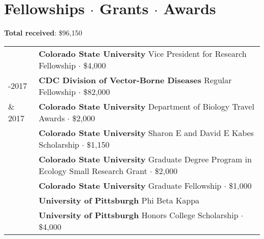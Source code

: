 \documentclass[letterpaper]{deedy-resume} %
\begin{document}
\section{Fellowships $\cdot$ Grants $\cdot$ Awards} 
\raggedright\textbf{Total received}: \$96,150\\
\sectionspace
\begin{tabular}{>{\raggedright\arraybackslash}p{2cm}p{16cm}}
2018 & \textbf{Colorado State University} Vice President for Research Fellowship $\cdot$ \$4,000\\
2015-2017 & \textbf{CDC Division of Vector-Borne Diseases} Regular Fellowship $\cdot$ \$82,000\\
2014 \& 2017 & \textbf{Colorado State University} Department of Biology Travel Awards $\cdot$ \$2,000\\
2015 & \textbf{Colorado State University} Sharon E and David E Kabes Scholarship $\cdot$ \$1,150\\
2014 & \textbf{Colorado State University} Graduate Degree Program in Ecology Small Research Grant $\cdot$ \$2,000\\
2013 & \textbf{Colorado State University} Graduate Fellowship $\cdot$ \$1,000\\
2011 & \textbf{University of Pittsburgh} Phi Beta Kappa\\
2007 & \textbf{University of Pittsburgh} Honors College Scholarship $\cdot$ \$4,000\\
\end{tabular}
\sectionspace

\end{document}

